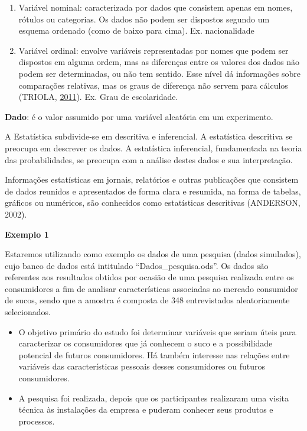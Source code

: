 \documentclass[12pt,brazil,]{book}
\begin{document}
\begin{enumerate}
\def\labelenumi{\alph{enumi})}
\item
  Variável nominal: caracterizada por dados que consistem apenas em
  nomes, rótulos ou categorias. Os dados não podem ser dispostos segundo
  um esquema ordenado (como de baixo para cima). Ex. nacionalidade
\item
  Variável ordinal: envolve variáveis representadas por nomes que podem
  ser dispostos em alguma ordem, mas as diferenças entre os valores dos
  dados não podem ser determinadas, ou não tem sentido. Esse nível dá
  informações sobre comparações relativas, mas os graus de diferença não
  servem para cálculos (TRIOLA,
  \protect\hyperlink{ref-triola1999}{2011}). Ex. Grau de escolaridade.
\end{enumerate}

\textbf{Dado}: é o valor assumido por uma variável aleatória em um
experimento.

A Estatística subdivide-se em descritiva e inferencial. A estatística
descritiva se preocupa em descrever os dados. A estatística inferencial,
fundamentada na teoria das probabilidades, se preocupa com a análise
destes dados e sua interpretação.

Informações estatísticas em jornais, relatórios e outras publicações que
consistem de dados reunidos e apresentados de forma clara e resumida, na
forma de tabelas, gráficos ou numéricos, são conhecidos como
estatísticas descritivas (ANDERSON, 2002).

\textbf{Exemplo 1}

Estaremos utilizando como exemplo os dados de uma pesquisa (dados
simulados), cujo banco de dados está intitulado ``Dados\_pesquisa.ods''.
Os dados são referentes aos resultados obtidos por ocasião de uma
pesquisa realizada entre os consumidores a fim de analisar
características associadas ao mercado consumidor de sucos, sendo que a
amostra é composta de 348 entrevistados aleatoriamente selecionados.

\begin{itemize}
\item
  O objetivo primário do estudo foi determinar variáveis que seriam
  úteis para caracterizar os consumidores que já conhecem o suco e a
  possibilidade potencial de futuros consumidores. Há também interesse
  nas relações entre variáveis das características pessoais desses
  consumidores ou futuros consumidores.
\item
  A pesquisa foi realizada, depois que os participantes realizaram uma
  visita técnica às instalações da empresa e puderam conhecer seus
  produtos e processos.
\end{itemize}
\end{document}
